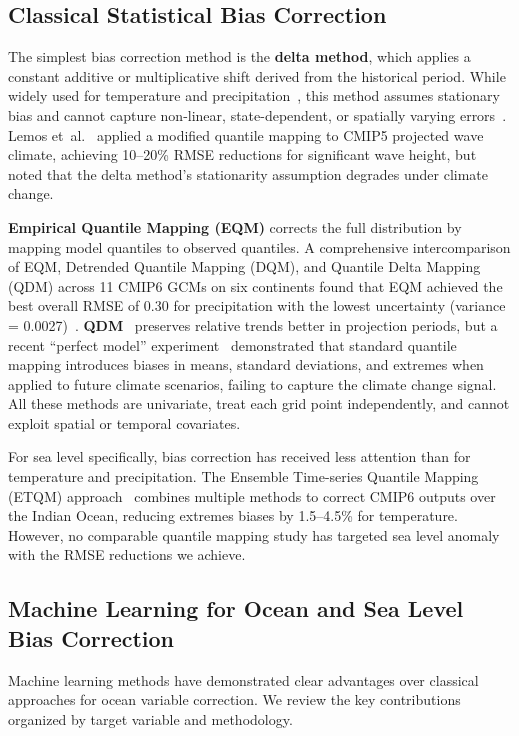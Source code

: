 \documentclass[conference]{IEEEtran}
\begin{document}
\subsection{Classical Statistical Bias Correction}

The simplest bias correction method is the \textbf{delta method}, which applies a constant additive or multiplicative shift derived from the historical period. While widely used for temperature and precipitation~\cite{lemos2020}, this method assumes stationary bias and cannot capture non-linear, state-dependent, or spatially varying errors~\cite{cannon2018}. Lemos et~al.~\cite{lemos2020} applied a modified quantile mapping to CMIP5 projected wave climate, achieving 10--20\% RMSE reductions for significant wave height, but noted that the delta method's stationarity assumption degrades under climate change.

\textbf{Empirical Quantile Mapping (EQM)} corrects the full distribution by mapping model quantiles to observed quantiles. A comprehensive intercomparison of EQM, Detrended Quantile Mapping (DQM), and Quantile Delta Mapping (QDM) across 11 CMIP6 GCMs on six continents found that EQM achieved the best overall RMSE of 0.30 for precipitation with the lowest uncertainty (variance = 0.0027)~\cite{intercomp2025}. \textbf{QDM}~\cite{cannon2018} preserves relative trends better in projection periods, but a recent ``perfect model'' experiment~\cite{qm_future2025} demonstrated that standard quantile mapping introduces biases in means, standard deviations, and extremes when applied to future climate scenarios, failing to capture the climate change signal. All these methods are univariate, treat each grid point independently, and cannot exploit spatial or temporal covariates.

For sea level specifically, bias correction has received less attention than for temperature and precipitation. The Ensemble Time-series Quantile Mapping (ETQM) approach~\cite{gupta2025} combines multiple methods to correct CMIP6 outputs over the Indian Ocean, reducing extremes biases by 1.5--4.5\% for temperature. However, no comparable quantile mapping study has targeted sea level anomaly with the RMSE reductions we achieve.

\subsection{Machine Learning for Ocean and Sea Level Bias Correction}

Machine learning methods have demonstrated clear advantages over classical approaches for ocean variable correction. We review the key contributions organized by target variable and methodology.
\end{document}
